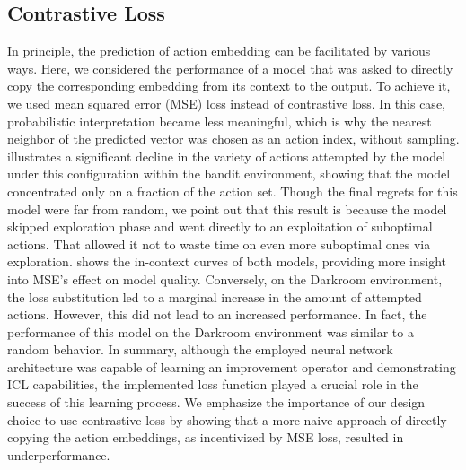\documentclass{article}
\theoremstyle{plain}
\theoremstyle{definition}
\theoremstyle{remark}
\begin{document}
\subsection{Contrastive Loss}
In principle, the prediction of action embedding can be facilitated by various ways. Here, we considered the performance of a model that was asked to directly copy the corresponding embedding from its context to the output. To achieve it, we used mean squared error (MSE) loss instead of contrastive loss.
In this case, probabilistic interpretation became less meaningful, which is why the nearest neighbor of the predicted vector was chosen as an action index, without sampling.
 illustrates a significant decline in the variety of actions attempted by the model under this configuration within the bandit environment, showing that the model concentrated only on a fraction of the action set. Though the final regrets for this model were far from random, we point out that this result is because the model skipped exploration phase and went directly to an exploitation of suboptimal actions. That allowed it not to waste time on even more suboptimal ones via exploration.  shows the in-context curves of both models, providing more insight into MSE's effect on model quality.
Conversely, on the Darkroom environment, the loss substitution led to a marginal increase in the amount of attempted actions. However, this did not lead to an increased performance. In fact, the performance of this model on the Darkroom environment was similar to a random behavior.
In summary, although the employed neural network architecture was capable of learning an improvement operator and demonstrating ICL capabilities, the implemented loss function played a crucial role in the success of this learning process. We emphasize the importance of our design choice to use contrastive loss by showing that a more naive approach of directly copying the action embeddings, as incentivized by MSE loss, resulted in underperformance.
\end{document}
